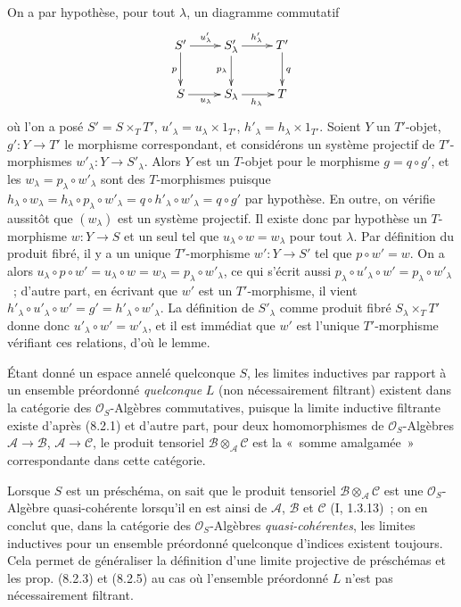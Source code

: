 On a par hypothèse, pour tout $\lambda$, un diagramme commutatif
\[
\xymatrix{
  S' \ar[r]^{u'_\lambda} \ar[d]_p
    & S'_\lambda \ar[r]^{h'_\lambda} \ar[d]_{p_\lambda}
    & T' \ar[d]^q \\
  S \ar[r]_{u_\lambda} & S_\lambda \ar[r]_{h_\lambda} & T
}
\]
où l'on a posé $S'=S\times_T T'$, $u'_\lambda=u_\lambda\times 1_{T'}$,
$h'_\lambda=h_\lambda\times 1_{T'}$. Soient $Y$ un $T'$-objet,
$g':Y\to T'$ le morphisme correspondant, et considérons un système
projectif de $T'$-morphismes $w'_\lambda:Y\to S'_\lambda$. Alors $Y$ est un
$T$-objet pour le morphisme $g=q\circ g'$, et les
$w_\lambda=p_\lambda\circ w'_\lambda$ sont des $T$-morphismes puisque
$h_\lambda\circ w_\lambda=h_\lambda\circ p_\lambda\circ w'_\lambda
=q\circ h'_\lambda\circ w'_\lambda=q\circ g'$ par hypothèse. En outre, on
vérifie aussitôt que $(w_\lambda)$ est un système projectif. Il existe donc
par hypothèse un $T$-morphisme $w:Y\to S$ et un seul tel que
$u_\lambda\circ w=w_\lambda$ pour tout $\lambda$. Par définition du produit
fibré, il y a un unique $T'$-morphisme $w':Y\to S'$ tel que
$p\circ w'=w$. On a alors
$u_\lambda\circ p\circ w'=u_\lambda\circ w=w_\lambda
=p_\lambda\circ w'_\lambda$, ce qui s'écrit aussi
$p_\lambda\circ u'_\lambda\circ w'=p_\lambda\circ w'_\lambda$~; d'autre
part, en écrivant que $w'$ est un $T'$-morphisme, il vient
$h'_\lambda\circ u'_\lambda\circ w'=g'=h'_\lambda\circ w'_\lambda$. La
définition de $S'_\lambda$ comme produit fibré $S_\lambda\times_T T'$ donne
donc $u'_\lambda\circ w'=w'_\lambda$, et il est immédiat que $w'$ est
l'unique $T'$-morphisme vérifiant ces relations, d'où le lemme.

\begin{remark}[8.2.7]
\label{IV.8.2.7-fr}
Étant donné un espace annelé quelconque $S$, les limites inductives par
rapport à un ensemble préordonné \emph{quelconque} $L$ (non nécessairement
filtrant) existent dans la catégorie des $\mathcal O_S$-Algèbres
commutatives, puisque la limite inductive filtrante existe d'après (8.2.1) et
d'autre part, pour deux homomorphismes de $\mathcal O_S$-Algèbres
$\mathscr A\to\mathscr B$, $\mathscr A\to\mathscr C$, le produit tensoriel
$\mathscr B\otimes_{\mathscr A}\mathscr C$ est la «~somme amalgamée~»
correspondante dans cette catégorie.

Lorsque $S$ est un préschéma, on sait que le produit tensoriel
$\mathscr B\otimes_{\mathscr A}\mathscr C$ est une $\mathcal O_S$-Algèbre
quasi-cohérente lorsqu'il en est ainsi de $\mathscr A$, $\mathscr B$ et
$\mathscr C$ (I, 1.3.13)~; on en conclut que, dans la catégorie des
$\mathcal O_S$-Algèbres \emph{quasi-cohérentes}, les limites inductives pour
un ensemble préordonné quelconque d'indices existent toujours. Cela permet de
généraliser la définition d'une limite projective de préschémas et les prop.
(8.2.3) et (8.2.5) au cas où l'ensemble préordonné $L$ n'est pas
nécessairement filtrant.
\end{remark}

